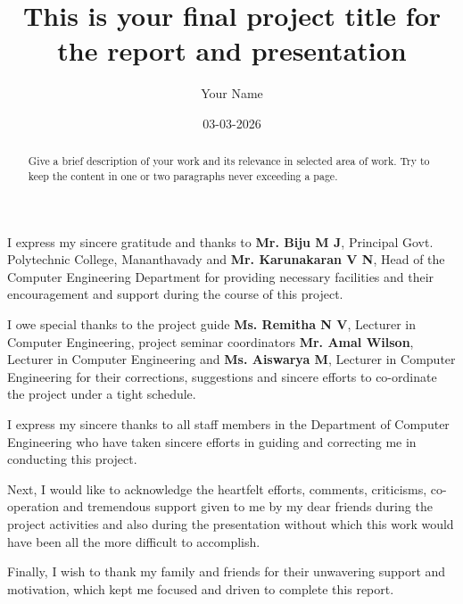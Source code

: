 \documentclass[minor, project]{gptcmdy}
\begin{document}
%
%

\title{This is your final project title for the report and presentation}
\author{Your Name}
\date{03-03-2026}
\maketitle


\certificate




\acknowledgements

I express my sincere gratitude and thanks to \textbf{Mr. Biju M J}, Principal Govt. Polytechnic College, Mananthavady and \textbf{Mr. Karunakaran V N}, Head of the Computer Engineering Department for providing necessary facilities and their encouragement and support during the course of this project.

I owe special thanks to the project guide \textbf{Ms. Remitha N V}, Lecturer in Computer Engineering, \if@Project project \else\if@Seminar seminar \fi\fi coordinators \textbf{Mr. Amal Wilson}, Lecturer in Computer Engineering and \textbf{Ms. Aiswarya M}, Lecturer in Computer Engineering for their corrections, suggestions and sincere efforts to co-ordinate the project under a tight schedule.

I express my sincere thanks to all staff members in the Department of Computer Engineering who have taken sincere efforts in guiding and correcting me in conducting this project.

Next, I would like to acknowledge the heartfelt efforts, comments, criticisms,
co-operation and tremendous support given to me by my dear friends during the project
activities and also during the presentation without which this work would have been all the more difficult to accomplish.

Finally, I wish to thank my family and friends for their unwavering support and motivation, which kept me focused and driven to complete this report.

\begin {abstract}
Give a brief description of your work and its relevance in selected area of work. Try to keep the content in one or two paragraphs never exceeding a page.
\end{abstract}
\end{document}
